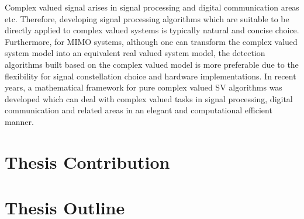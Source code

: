 Complex valued signal arises in signal processing and digital communication areas etc. Therefore, developing signal processing algorithms which are suitable to be directly applied to complex valued systems is typically natural and concise choice. Furthermore, for MIMO systems, although one can transform the complex valued system model into an equivalent real valued system model, the detection algorithms built based on the complex valued model is more preferable due to the flexibility for signal constellation choice and hardware implementations\cite{fiftyYang2015}. In recent years, a mathematical framework for pure complex valued SV algorithms was developed which can deal with complex valued tasks in signal processing, digital communication and related areas in an elegant and computational efficient manner\cite{bouboulis2013complex}.  


\section{Thesis Contribution}


\section{Thesis Outline}